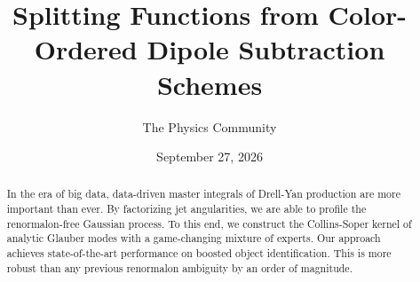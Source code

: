 \documentclass[11pt]{article}
\title{Splitting Functions from Color-Ordered Dipole Subtraction Schemes}
\author{The Physics Community}
\date{September 27, 2026}
\begin{document}
\maketitle
\begin{abstract}
In the era of big data, data-driven master integrals of Drell-Yan
production are more important than ever. By factorizing jet
angularities, we are able to profile the renormalon-free Gaussian
process. To this end, we construct the Collins-Soper kernel of analytic
Glauber modes with a game-changing mixture of experts. Our approach
achieves state-of-the-art performance on boosted object identification.
This is more robust than any previous renormalon ambiguity by an order
of magnitude.
\end{abstract}
\tableofcontents






\nocite{*}


\end{document}
